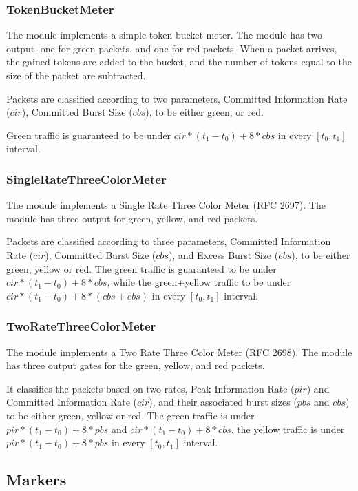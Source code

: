 \subsubsection*{TokenBucketMeter}

The  module implements a simple token bucket meter.
The module has two output, one for green packets, and one for red packets.
When a packet arrives, the gained tokens are added to the bucket, and
the number of tokens equal to the size of the packet are subtracted.

Packets are classified according to two parameters,
Committed Information Rate ($cir$), Committed Burst Size ($cbs$),
to be either green, or red.

Green traffic is guaranteed to be under $cir*(t_1-t_0)+8*cbs$ in
every $[t_0,t_1]$ interval.

\subsubsection*{SingleRateThreeColorMeter}

The  module implements a
Single Rate Three Color Meter (RFC 2697).
The module has three output for green, yellow, and red packets.

Packets are classified according to three parameters,
Committed Information Rate ($cir$), Committed Burst Size ($cbs$),
and Excess Burst Size ($ebs$), to be either green, yellow or red.
The green traffic is guaranteed to be under $cir*(t_1-t_0)+8*cbs$,
while the green+yellow traffic to be under $cir*(t_1-t_0)+8*(cbs+ebs)$
in every $[t_0,t_1]$ interval.


\subsubsection*{TwoRateThreeColorMeter}

The  module implements a
Two Rate Three Color Meter (RFC 2698). The module has three output
gates for the green, yellow, and red packets.

It classifies the packets based on two rates, Peak Information Rate ($pir$)
and Committed Information Rate ($cir$), and their associated burst sizes
($pbs$ and $cbs$) to be either green, yellow or red. The green traffic
is under $pir*(t_1-t_0)+8*pbs$ and $cir*(t_1-t_0)+8*cbs$, the yellow traffic
is under $pir*(t_1-t_0)+8*pbs$ in every $[t_0,t_1]$ interval.

\subsection{Markers}

